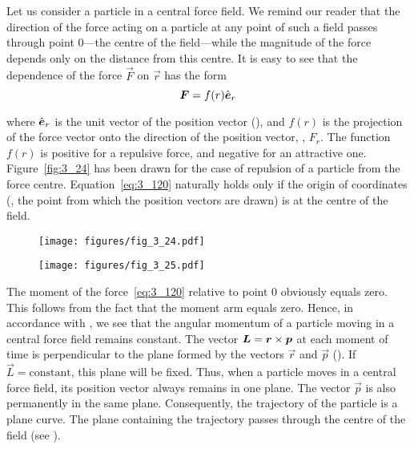 Let us consider a particle in a central force field. We remind our reader that the direction of the force acting on a particle at any point of such a field passes through point $0$---the centre of the field---while the magnitude of the force depends only on the distance from this centre. It is easy to see that the dependence of the force $\vec{F}$ on $\vec{r}$ has the form
\begin{equation}\label{eq:3_120}
\boldsymbol{F} = f(r) \hat{\boldsymbol{e}}_{r}
\end{equation}

\noindent
where $\hat{\boldsymbol{e}}_{r}$ is the unit vector of the position vector (), and $f(r)$ is the projection of the force vector onto the direction of the position vector, \ie, $F_r$. The function $f(r)$ is positive for a repulsive force, and negative for an attractive one. Figure~\ref{fig:3_24} has been drawn for the case of repulsion of a particle from the force centre. Equation~\eqref{eq:3_120} naturally holds only if the origin of coordinates (\ie, the point from which the position vectors are drawn) is at the centre of the field.

\begin{figure}[t]
	\hspace{-0.5cm}
	\begin{minipage}[t]{0.5\linewidth}
		\begin{center}
			\texttt{[image: figures/fig\_3\_24.pdf]}
			\caption[]{}
			\label{fig:3_24}
		\end{center}
	\end{minipage}
	\hspace{-0.5cm}
	\begin{minipage}[t]{0.5\linewidth}
		\begin{center}
			\texttt{[image: figures/fig\_3\_25.pdf]}
			\caption[]{}
			\label{fig:3_25}
		\end{center}
	\end{minipage}
	\vspace{-0.3cm}
\end{figure}

The moment of the force~\eqref{eq:3_120} relative to point $0$ obviously equals zero. This follows from the fact that the moment arm equals zero. Hence, in accordance with , we see that the angular momentum of a particle moving in a central force field remains constant. The vector $\boldsymbol{L}=\boldsymbol{r}\times\boldsymbol{p}$ at each moment of time is perpendicular to the plane formed by the vectors $\vec{r}$ and $\vec{p}$ (). If $\vec{L}=\text{constant}$, this plane will be fixed. Thus, when a particle moves in a central force field, its position vector always remains in one plane. The vector $\vec{p}$ is also permanently in the same plane. Consequently, the trajectory of the particle is a plane curve. The plane containing the trajectory passes through the centre of the field (see ).


